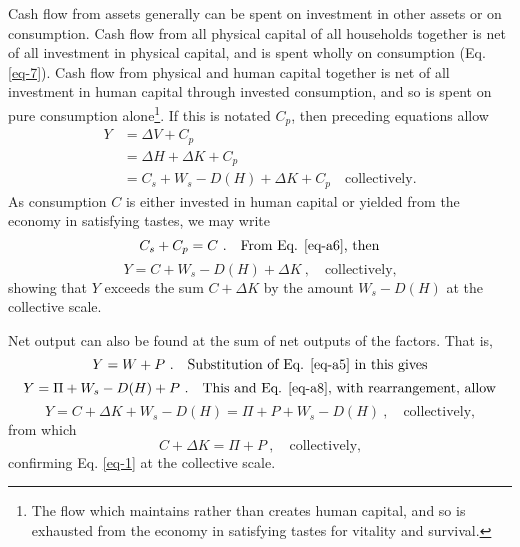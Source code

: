 Cash flow from assets generally can be spent on investment in other assets or on consumption. Cash flow from all physical capital of all households together is net of all investment in physical capital, and is spent wholly on consumption (Eq. \eqref{eq-7}). Cash flow from physical and human capital together is net of all investment in human capital through invested consumption, and so is spent on pure consumption alone\footnote{The flow which maintains rather than creates human capital, and so is exhausted from the economy in satisfying tastes for vitality and survival.}. If this is notated $C_p$, then preceding equations allow
\begin{equation}
\begin{aligned}
Y &= \Delta V + C_p \\
&= \Delta H + \Delta K + C_p \\
&= C_s + W_s - D(H) + \Delta K + C_p \quad \text{collectively.} \label{eq-a6}
\end{aligned}
\end{equation}
As consumption $C$ is either invested in human capital or yielded from the economy in satisfying tastes, we may write
\begin{equation}
C_s + C_p = C \ . \quad \text{From Eq. \eqref{eq-a6}, then} \label{eq-a7}
\end{equation}
\vspace{-5ex}
\begin{equation}
Y = C + W_s - D(H) + \Delta K \ , \quad \text{collectively,} \label{eq-a8}
\end{equation}
showing that $Y$ exceeds the sum $C + \Delta K$ by the amount $W_s - D(H)$ at the collective scale.


Net output can also be found at the sum of net outputs of the factors. That is,
\begin{equation}
Y = W + P \ . \quad \text{Substitution of Eq. \eqref{eq-a5} in this gives} \label{eq-a9}
\end{equation}
\vspace{-5ex}
\begin{equation}
Y = \Pi + W_s - D(H) + P \ . \quad \text{This and Eq. \eqref{eq-a8}, with rearrangement, allow} \label{eq-a10}
\end{equation}
\vspace{-5ex}
\begin{equation}
Y = C + \Delta K + W_s - D(H) = \Pi + P + W_s - D(H) \ , \quad \text{collectively,} \label{eq-a11}
\end{equation}
from which
\begin{equation}
C + \Delta K = \Pi + P \ , \quad \text{collectively,} 
\end{equation}
confirming Eq. \eqref{eq-1} at the collective scale.



